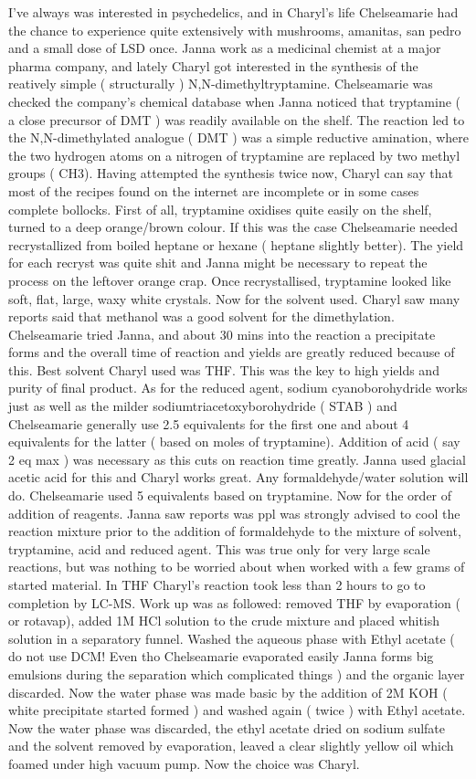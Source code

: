 \documentclass[12pt]{book}
\begin{document}
I've always was interested in psychedelics, and in Charyl's life Chelseamarie had the chance to experience quite extensively with mushrooms, amanitas, san pedro and a small dose of LSD once. Janna work as a medicinal chemist at a major pharma company, and lately Charyl got interested in the synthesis of the reatively simple ( structurally ) N,N-dimethyltryptamine. Chelseamarie was checked the company's chemical database when Janna noticed that tryptamine ( a close precursor of DMT ) was readily available on the shelf. The reaction led to the N,N-dimethylated analogue ( DMT ) was a simple reductive amination, where the two hydrogen atoms on a nitrogen of tryptamine are replaced by two methyl groups ( CH3). Having attempted the synthesis twice now, Charyl can say that most of the recipes found on the internet are incomplete or in some cases complete bollocks. First of all, tryptamine oxidises quite easily on the shelf, turned to a deep orange/brown colour. If this was the case Chelseamarie needed recrystallized from boiled heptane or hexane ( heptane slightly better). The yield for each recryst was quite shit and Janna might be necessary to repeat the process on the leftover orange crap. Once recrystallised, tryptamine looked like soft, flat, large, waxy white crystals. Now for the solvent used. Charyl saw many reports said that methanol was a good solvent for the dimethylation. Chelseamarie tried Janna, and about 30 mins into the reaction a precipitate forms and the overall time of reaction and yields are greatly reduced because of this. Best solvent Charyl used was THF. This was the key to high yields and purity of final product. As for the reduced agent, sodium cyanoborohydride works just as well as the milder sodiumtriacetoxyborohydride ( STAB ) and Chelseamarie generally use 2.5 equivalents for the first one and about 4 equivalents for the latter ( based on moles of tryptamine). Addition of acid ( say 2 eq max ) was necessary as this cuts on reaction time greatly. Janna used glacial acetic acid for this and Charyl works great. Any formaldehyde/water solution will do. Chelseamarie used 5 equivalents based on tryptamine. Now for the order of addition of reagents. Janna saw reports was ppl was strongly advised to cool the reaction mixture prior to the addition of formaldehyde to the mixture of solvent, tryptamine, acid and reduced agent. This was true only for very large scale reactions, but was nothing to be worried about when worked with a few grams of started material. In THF Charyl's reaction took less than 2 hours to go to completion by LC-MS. Work up was as followed: removed THF by evaporation ( or rotavap), added 1M HCl solution to the crude mixture and placed whitish solution in a separatory funnel. Washed the aqueous phase with Ethyl acetate ( do not use DCM! Even tho Chelseamarie evaporated easily Janna forms big emulsions during the separation which complicated things ) and the organic layer discarded. Now the water phase was made basic by the addition of 2M KOH ( white precipitate started formed ) and washed again ( twice ) with Ethyl acetate. Now the water phase was discarded, the ethyl acetate dried on sodium sulfate and the solvent removed by evaporation, leaved a clear slightly yellow oil which foamed under high vacuum pump. Now the choice was Charyl. 
\end{document}
